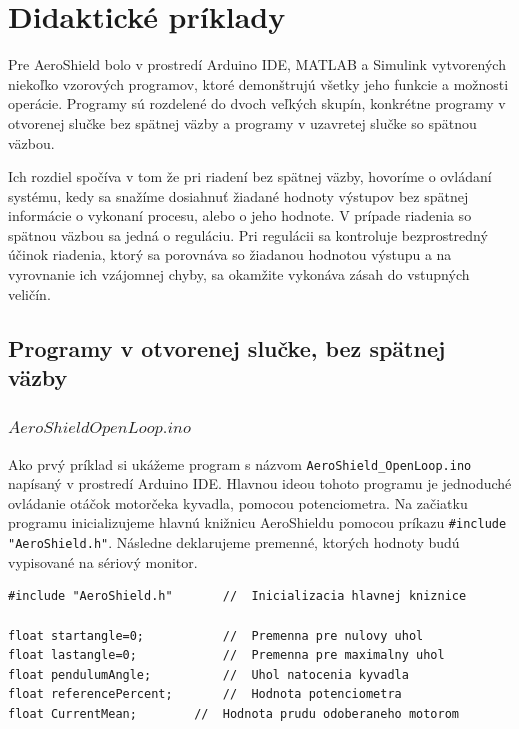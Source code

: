 \chapter{Didaktické príklady}
\label{Didaktické príklady}

Pre AeroShield bolo v prostredí Arduino IDE, MATLAB a Simulink vytvorených niekoľko vzorových programov, ktoré demonštrujú všetky jeho funkcie a možnosti operácie. Programy sú rozdelené do dvoch veľkých skupín, konkrétne programy v otvorenej slučke bez spätnej väzby a programy v uzavretej slučke so spätnou väzbou. 

Ich rozdiel spočíva v tom že pri riadení bez spätnej väzby, hovoríme o ovládaní systému, kedy sa snažíme dosiahnuť žiadané hodnoty výstupov bez spätnej informácie o vykonaní procesu, alebo o jeho hodnote. V prípade riadenia so spätnou väzbou sa jedná o reguláciu. Pri regulácii sa kontroluje bezprostredný účinok riadenia, ktorý sa porovnáva so žiadanou hodnotou výstupu a na vyrovnanie ich vzájomnej chyby, sa okamžite vykonáva zásah do vstupných veličín. 

\section{Programy v otvorenej slučke, bez spätnej väzby}
\subsection{$AeroShieldOpenLoop.ino$}

Ako prvý príklad si ukážeme program s názvom \verb|AeroShield_OpenLoop.ino| napísaný v prostredí Arduino IDE. Hlavnou ideou tohoto programu je jednoduché ovládanie otáčok motorčeka kyvadla, pomocou potenciometra. Na začiatku programu inicializujeme hlavnú knižnicu AeroShieldu pomocou príkazu \verb|#include "AeroShield.h"|. Následne deklarujeme premenné, ktorých hodnoty budú vypisované na sériový monitor. 

\begin{lstlisting}[caption={AeroShield open loop dekleracia.},captionpos=b]
#include "AeroShield.h"       //  Inicializacia hlavnej kniznice

float startangle=0;           //  Premenna pre nulovy uhol
float lastangle=0;            //  Premenna pre maximalny uhol 
float pendulumAngle;          //  Uhol natocenia kyvadla
float referencePercent;       //  Hodnota potenciometra
float CurrentMean;	      //  Hodnota prudu odoberaneho motorom 
\end{lstlisting}


